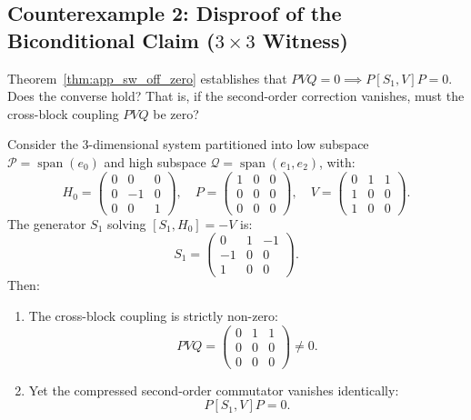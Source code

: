 \subsection[Counterexample 2: 3x3 Non-Equivalence Witness]{Counterexample 2: Disproof of the Biconditional Claim ($3\times 3$ Witness)}

Theorem~\ref{thm:app_sw_off_zero} establishes that $P V Q = 0 \implies P [S_1, V] P = 0$. Does the converse hold? That is, if the second-order correction vanishes, must the cross-block coupling $P V Q$ be zero?

\begin{proposition}
\label{prop:app_3x3_witness}
Consider the 3-dimensional system partitioned into low subspace $\mathcal{P} = \operatorname{span}(e_0)$ and high subspace $\mathcal{Q} = \operatorname{span}(e_1, e_2)$, with:
\begin{equation}
H_0 = \begin{pmatrix} 0 & 0 & 0 \\ 0 & -1 & 0 \\ 0 & 0 & 1 \end{pmatrix}, \quad P = \begin{pmatrix} 1 & 0 & 0 \\ 0 & 0 & 0 \\ 0 & 0 & 0 \end{pmatrix}, \quad V = \begin{pmatrix} 0 & 1 & 1 \\ 1 & 0 & 0 \\ 1 & 0 & 0 \end{pmatrix}.
\end{equation}
The generator $S_1$ solving $[S_1, H_0] = -V$ is:
\begin{equation}
S_1 = \begin{pmatrix} 0 & 1 & -1 \\ -1 & 0 & 0 \\ 1 & 0 & 0 \end{pmatrix}.
\end{equation}
Then:
\begin{enumerate}
    \item The cross-block coupling is strictly non-zero:
    \begin{equation}
    P V Q = \begin{pmatrix} 0 & 1 & 1 \\ 0 & 0 & 0 \\ 0 & 0 & 0 \end{pmatrix} \neq 0.
    \end{equation}
    \item Yet the compressed second-order commutator vanishes identically:
    \begin{equation}
    P [S_1, V] P = 0.
    \end{equation}
\end{enumerate}
\end{proposition}

